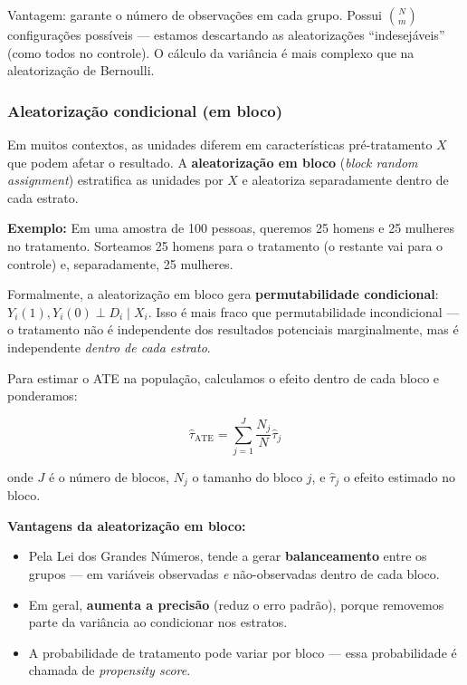 \documentclass[
]{article}
\providecommand{\tightlist}{%
  \setlength{\itemsep}{0pt}\setlength{\parskip}{0pt}}
\begin{document}
Vantagem: garante o número de observações em cada grupo. Possui \(\binom{N}{m}\) configurações possíveis --- estamos descartando as aleatorizações ``indesejáveis'' (como todos no controle). O cálculo da variância é mais complexo que na aleatorização de Bernoulli.

\subsubsection{Aleatorização condicional (em bloco)}\label{aleatorizauxe7uxe3o-condicional-em-bloco}

Em muitos contextos, as unidades diferem em características pré-tratamento \(X\) que podem afetar o resultado. A \textbf{aleatorização em bloco} (\emph{block random assignment}) estratifica as unidades por \(X\) e aleatoriza separadamente dentro de cada estrato.

\textbf{Exemplo:} Em uma amostra de 100 pessoas, queremos 25 homens e 25 mulheres no tratamento. Sorteamos 25 homens para o tratamento (o restante vai para o controle) e, separadamente, 25 mulheres.

Formalmente, a aleatorização em bloco gera \textbf{permutabilidade condicional}: \(Y_i(1), Y_i(0) \perp D_i \mid X_i\). Isso é mais fraco que permutabilidade incondicional --- o tratamento não é independente dos resultados potenciais marginalmente, mas é independente \emph{dentro de cada estrato}.

Para estimar o ATE na população, calculamos o efeito dentro de cada bloco e ponderamos:

\[\hat{\tau}_{\text{ATE}} = \sum_{j=1}^{J} \frac{N_j}{N} \hat{\tau}_j\]

onde \(J\) é o número de blocos, \(N_j\) o tamanho do bloco \(j\), e \(\hat{\tau}_j\) o efeito estimado no bloco.

\textbf{Vantagens da aleatorização em bloco:}

\begin{itemize}
\tightlist
\item
  Pela Lei dos Grandes Números, tende a gerar \textbf{balanceamento} entre os grupos --- em variáveis observadas \emph{e} não-observadas dentro de cada bloco.
\item
  Em geral, \textbf{aumenta a precisão} (reduz o erro padrão), porque removemos parte da variância ao condicionar nos estratos.
\item
  A probabilidade de tratamento pode variar por bloco --- essa probabilidade é chamada de \emph{propensity score}.
\end{itemize}
\end{document}
